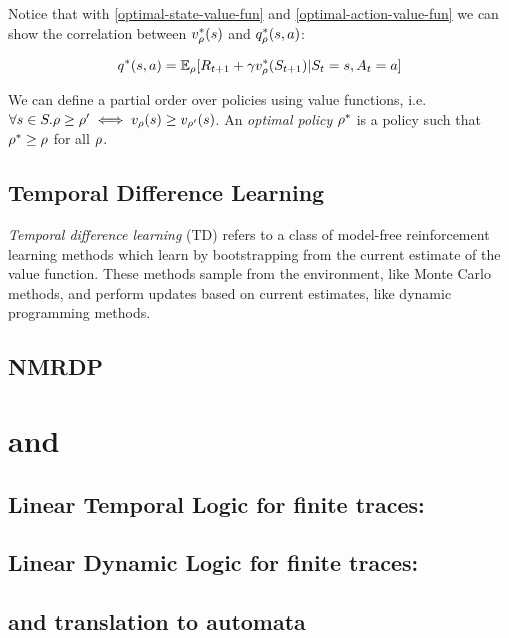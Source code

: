	Notice that with \ref{optimal-state-value-fun} and \ref{optimal-action-value-fun} we can show the correlation between $v^*_\rho(s)$ and $q^*_\rho(s, a)$:
	
	\begin{equation}
		q^*(s, a) = \mathbb{E}_\rho[R_{t+1} + \gamma v^*_\rho(S_{t+1})| S_t = s, A_t = a]
	\end{equation}
	
	
	We can define a partial order over policies using value functions, i.e. $\forall s\in S. \rho \ge \rho' \iff v_\rho(s) \ge v_{\rho'}(s)$. An \emph{optimal policy} $\rho^*$ is a policy such that $\rho^* \ge \rho$ for all $\rho$. 
	
	
\subsection{Temporal Difference Learning}

\emph{Temporal difference learning} (TD) refers to a class of model-free reinforcement learning methods which learn by bootstrapping from the current estimate of the value function. These methods sample from the environment, like Monte Carlo methods, and perform updates based on current estimates, like dynamic programming methods.

\subsection{NMRDP}
\label{NMRDP}
\section{\LTLf and \LDLf}
\subsection{Linear Temporal Logic for finite traces: \LTLf}
\subsection{Linear Dynamic Logic for finite traces: \LDLf}
\subsection{\LTLf and \LDLf translation to automata}
